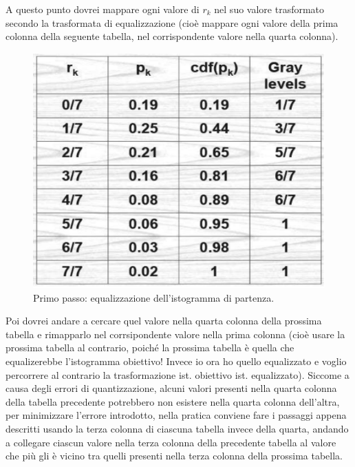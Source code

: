 \documentclass[a4paper,11pt]{article}
\begin{document}
A questo punto dovrei mappare ogni valore di $r_k$ nel suo valore trasformato secondo la trasformata di equalizzazione (cioè mappare ogni valore della prima colonna della seguente tabella,
nel corrispondente valore nella quarta colonna).

\renewcommand{\thefigure}{5.20}
\begin{figure}[!h]
  \centering
    \includegraphics[scale=0.4]{images/5/hist_spec_2.png}
    \caption{Primo passo: equalizzazione dell'istogramma di partenza.}
\end{figure}

Poi dovrei andare a cercare quel valore nella quarta colonna della prossima tabella e rimapparlo nel corrsipondente valore nella prima
colonna (cioè usare la prossima tabella al contrario, poiché la prossima tabella è quella che equalizerebbe l'istogramma obiettivo! Invece io ora ho quello equalizzato
e voglio percorrere al contrario la trasformazione ist. obiettivo \textrightarrow{} ist. equalizzato). Siccome a causa degli errori di quantizzazione, alcuni valori presenti nella quarta
colonna della tabella precedente potrebbero non esistere nella quarta colonna dell'altra, per minimizzare l'errore introdotto, nella pratica conviene fare i passaggi appena descritti usando
la terza colonna di ciascuna tabella invece della quarta, andando a collegare ciascun valore nella terza colonna della precedente tabella
al valore che più gli è vicino tra quelli presenti nella terza colonna della prossima tabella.
\end{document}
